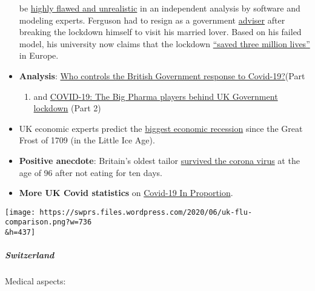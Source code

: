 \begin{itemize}
  be
  \href{https://www.telegraph.co.uk/technology/2020/05/16/neil-fergusons-imperial-model-could-devastating-software-mistake/}{highly
  flawed and unrealistic} in an independent analysis by software and
  modeling experts. Ferguson had to resign as a government
  \href{https://www.telegraph.co.uk/news/2020/05/05/exclusive-government-scientist-neil-ferguson-resigns-breaking/}{adviser}
  after breaking the lockdown himself to visit his married lover. Based
  on his failed model, his university now claims that the lockdown
  \href{https://www.bbc.co.uk/news/health-52968523}{``saved three
  million lives''} in Europe.
\item
  \textbf{Analysis}:
  \href{https://www.ukcolumn.org/article/who-controls-british-government-response-covid19-part-one}{Who
  controls the British Government response to Covid-19?}(Part

  \begin{enumerate}
  \def\labelenumi{\arabic{enumi})}
  \tightlist
  \item
    and
    \href{https://www.ukcolumn.org/article/covid\%E2\%80\%9319-big-pharma-players-behind-uk-government-lockdown}{COVID-19:
    The Big Pharma players behind UK Government lockdown} (Part 2)
  \end{enumerate}
\item
  UK economic experts predict the
  \href{https://twitter.com/FinancialTimes/status/1258499372251328515}{biggest
  economic recession} since the Great Frost of 1709 (in the Little Ice
  Age).
\item
  \textbf{Positive anecdote}: Britain's oldest tailor
  \href{https://www.yorkpress.co.uk/news/18449261.oldest-working-tailor-uk-elwyn-96-beats-coronavirus/}{survived
  the corona virus} at the age of 96 after not eating for ten days.
\item
  \textbf{More UK Covid statistics} on
  \href{http://inproportion2.talkigy.com/}{Covid-19 In Proportion}.
\end{itemize}

\texttt{[image: https://swprs.files.wordpress.com/2020/06/uk-flu-comparison.png?w=736\\\&h=437]}

\hypertarget{switzerland-1}{%
\subparagraph{\texorpdfstring{\textbf{Switzerland}}{Switzerland}}\label{switzerland-1}}

Medical aspects:

